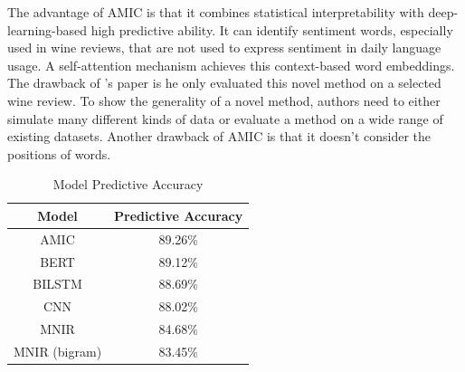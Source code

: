\documentclass[aoas]{imsart}
\numberwithin{equation}{section}
\theoremstyle{plain}
\theoremstyle{remark}
\begin{document}
The advantage of AMIC is that it combines statistical interpretability with deep-learning-based high predictive ability. It can identify sentiment words, especially used in wine reviews, that are not used to express sentiment in daily language usage. A self-attention mechanism achieves this context-based word embeddings. The drawback of \cite{chenyu}'s paper is he only evaluated this novel method on a selected wine review. To show the generality of a novel method, authors need to either simulate many different kinds of data or evaluate a method on a wide range of existing datasets. Another drawback of AMIC is that it doesn't consider the positions of words.

\begin{table}[ht]
    \centering
    \begin{tabular}{|c|c|} \hline 
           Model& Predictive Accuracy\\ \hline 
           AMIC& 89.26\%\\ \hline 
           BERT& 89.12\%\\ \hline 
           BILSTM& 88.69\%\\ \hline 
           CNN& 88.02\%\\ \hline 
           MNIR& 84.68\%\\ \hline 
           MNIR (bigram)& 83.45\%\\ \hline
    \end{tabular}
    \caption{Model Predictive Accuracy}
    \label{tab:acc}
\end{table}
\end{document}
